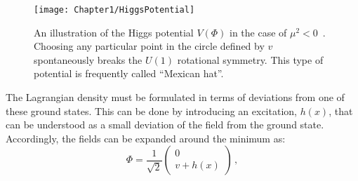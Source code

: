 \begin{figure}
    \centering
    \texttt{[image: Chapter1/HiggsPotential]}
    \caption{An illustration of the Higgs potential $V(\Phi)$ in the case of $\mu^{2}<0$~\cite{Bass:2764481}. Choosing any particular point in the circle defined by $v$ spontaneously breaks the $U(1)$ rotational symmetry. This type of potential is
    frequently called ``Mexican hat''.}
    \label{fig:Chap1:SM:HiggsMechanism:Potential}
\end{figure}

The Lagrangian density must be formulated in terms of deviations from one of these
ground states. This can be done by introducing an excitation, $h(x)$, that can be understood
as a small deviation of the field from the ground state. 
Accordingly, the fields can be expanded around the minimum as:
\begin{equation}\label{eq:chap1:HiggsMechanism:SymmetryBreaking}
	\Phi = \frac{1}{\sqrt{2}} \begin{pmatrix} 0 \\ v+h(x) \end{pmatrix} \, ,
\end{equation}
